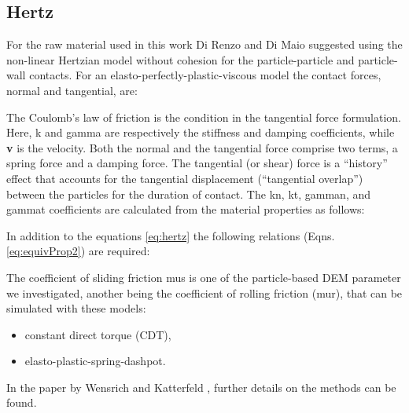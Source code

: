\subsection{Hertz}
\label{subsec:hertz}

For the raw material used in this work 
Di Renzo and Di Maio \cite{RefWorks:145} suggested using the non-linear
Hertzian model without cohesion for the particle-particle and particle-wall contacts. 
For an elasto-perfectly-plastic-viscous model the contact forces, normal and
tangential, are:


The Coulomb's law of friction is the condition in the tangential force
formulation.\\
Here, \acs{k} and \acs{gamma} are respectively the stiffness and damping
coefficients, while \textbf{v} is the velocity.
Both the normal and the tangential
force comprise two terms, a spring force and a damping force. 
The tangential (or shear) force is a ``history'' effect that accounts for the
tangential displacement (``tangential overlap'') between the particles for the
duration of contact.
The \acs{kn}, \acs{kt}, \acs{gamman}, and \acs{gammat} coefficients are
calculated from the material properties as follows:

In addition to the equations \ref{eq:hertz} the following relations (Eqns. \ref{eq:equivProp2}) are required:


The coefficient of sliding friction \acs{mus} is 
one of the particle-based \acs{DEM} parameter we investigated, 
another being the coefficient of rolling friction (\acs{mur}),
that can be simulated with these models:
\begin{itemize}
  \item{constant direct torque (CDT),}
  \item{elasto-plastic-spring-dashpot.}
\end{itemize}

In the paper by Wensrich and Katterfeld \cite{RefWorks:87}, further details on
the methods can be found.\\



% 


